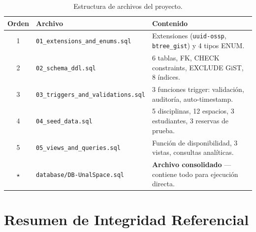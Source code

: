 \documentclass[12pt, a4paper]{article}
\begin{document}
\begin{table}[H]
\centering
\renewcommand{\arraystretch}{1.3}
\begin{tabularx}{\textwidth}{c l X}
    \toprule
    \textbf{Orden} & \textbf{Archivo} & \textbf{Contenido} \\
    \midrule
    1 & \texttt{01\_extensions\_and\_enums.sql} & Extensiones (\texttt{uuid-ossp}, \texttt{btree\_gist}) y 4 tipos ENUM. \\
    2 & \texttt{02\_schema\_ddl.sql} & 6 tablas, FK, CHECK constraints, EXCLUDE GiST, 8 índices. \\
    3 & \texttt{03\_triggers\_and\_validations.sql} & 3 funciones trigger: validación, auditoría, auto-timestamp. \\
    4 & \texttt{04\_seed\_data.sql} & 5 disciplinas, 12 espacios, 3 estudiantes, 3 reservas de prueba. \\
    5 & \texttt{05\_views\_and\_queries.sql} & Función de disponibilidad, 3 vistas, consultas analíticas. \\
    \midrule
    $\star$ & \texttt{database/DB-UnalSpace.sql} & \textbf{Archivo consolidado} --- contiene todo para ejecución directa. \\
    \bottomrule
\end{tabularx}
\caption{Estructura de archivos del proyecto.}
\end{table}


\section{Resumen de Integridad Referencial}
\end{document}
